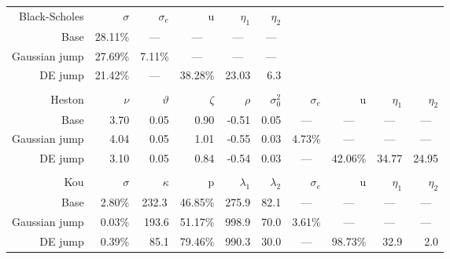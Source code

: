 \documentclass[11pt]{article}
\numberwithin{equation}{section}
\numberwithin{theorem}{section}
\begin{document}

\begin{table}[H]
  \centering
  \small
        \begin{tabular}{rrrrrrrrrr}
Black-Scholes & $\sigma$ & $\sigma_e$ & u     & $\eta_1$  & $\eta_2$  &       &       &       &  \\
\cline{1-6}    Base & 28.11\% & \multicolumn{1}{c}{---} & \multicolumn{1}{c}{---} & \multicolumn{1}{c}{---} & \multicolumn{1}{c}{---} & \multicolumn{1}{c}{} &       &       &  \\
    Gaussian jump & 27.69\% & 7.11\% & \multicolumn{1}{c}{---} & \multicolumn{1}{c}{---} & \multicolumn{1}{c}{---} &       &       &       &  \\
    DE jump & 21.42\% & \multicolumn{1}{c}{---} & \multicolumn{1}{c}{38.28\%} &         23.03  & 6.3   &       &       &       &  \\
\cline{1-6}  
          &       &       &       &       &       &       &       &       &  \\
    Heston & $\nu$ & $\vartheta$ & $\zeta$  & $\rho$   & $\sigma_0^2$    & $\sigma_e$ & u     & $\eta_1$  & $   \eta_2$ \\
     \hline
    Base &           3.70  &           0.05  &           0.90  & -0.51 &           0.05  & \multicolumn{1}{c}{---} & \multicolumn{1}{c}{---} & \multicolumn{1}{c}{---} & \multicolumn{1}{c}{---} \\
    Gaussian jump &           4.04  &           0.05  &           1.01  & -0.55 &           0.03  & 4.73\% & \multicolumn{1}{c}{---} & \multicolumn{1}{c}{---} & \multicolumn{1}{c}{---} \\
    DE jump &           3.10  &           0.05  &           0.84  & -0.54 &           0.03  & \multicolumn{1}{c}{---} & 42.06\% &         34.77  &         24.95  \\
    \hline
          &       &       &       &       &       &       &       &       &  \\
    Kou   & $\sigma$ & $\kappa$  & p     & $\lambda_1$ & $\lambda_2$ & $\sigma_e$  & u     & $\eta_1$  & $\eta_2$ \\
    \hline
    Base & 2.80\% & \multicolumn{1}{c}{232.3} & \multicolumn{1}{c}{46.85\%} & \multicolumn{1}{c}{275.9} & \multicolumn{1}{c}{82.1} & \multicolumn{1}{c}{---} & \multicolumn{1}{c}{---} & \multicolumn{1}{c}{---} & \multicolumn{1}{c}{---} \\
    Gaussian jump & 0.03\% & 193.6 & 51.17\% & 998.9 & 70.0  & 3.61\% & \multicolumn{1}{c}{---} & \multicolumn{1}{c}{---} & \multicolumn{1}{c}{---} \\
    DE jump & 0.39\% & 85.1  & 79.46\% & 990.3 & 30.0  & \multicolumn{1}{c}{---} & 98.73\% & 32.9  & 2.0 \\
    \hline
    \end{tabular}%


\end{table}
\end{document}
